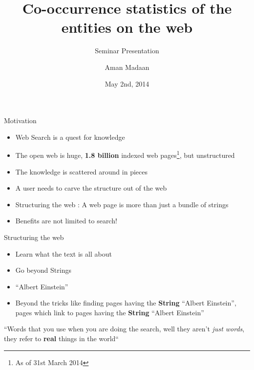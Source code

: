 \documentclass{beamer}
\title{Co-occurrence statistics of the entities on the web}
\subtitle{Seminar Presentation}
\author[Aman Madaan]{Aman Madaan}
\institute[IITB]{
  Indian Institute of Technology Bombay, Mumbai
}
\date{May 2nd, 2014}
\begin{document}
\maketitle
\begin{frame}{Motivation}


 \begin{itemize}
  \item Web Search is a quest for knowledge \medskip
  \item The open web is huge, \textbf{1.8 billion} indexed web pages\footnote{As of 31st March 2014}, but unstructured  \medskip
  \item The knowledge is scattered around in pieces \medskip
  \item A user needs to carve the structure out of the web  \medskip
  \item Structuring the web : A web page is more than just a bundle of strings \medskip
  \item Benefits are not limited to search! \medskip
 \end{itemize}

\end{frame}


\begin{frame}{Structuring the web}
 \begin{itemize}
  \item Learn what the text is all about \medskip
  \item Go beyond Strings \medskip
  \item ``Albert Einstein'' \medskip
  \item Beyond the tricks like finding pages having the \textbf{String} ``Albert Einstein'', \medskip
  pages which link to pages having the \textbf{String} ``Albert Einstein''
 \end{itemize}

\end{frame}

\begin{frame}
\begin{exampleblock}{}
  {\large ``Words that you use when you are doing the search, well they aren't \emph{just words}, they refer to \textbf{real} things
in the world``}
  \vskip5mm
  \hspace*{}
\end{exampleblock}
\end{frame}
\end{document}
